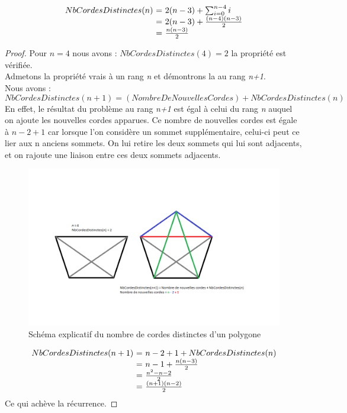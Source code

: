 \documentclass[a4paper,10pt]{article}
\begin{document}
\begin{equation} 
\begin{array}{r @{=} l}
NbCordesDistinctes(n) \ & \ 2(n-3) + \sum_{i=0}^{n-4} i \\
		      & \ 2(n-3) + \frac{(n-4)(n-3)}{2} \\
		      & \ \frac{n(n-3)}{2}
\end{array} 
\end{equation}


\begin{proof}
Pour \(n = 4\) nous avons : \(NbCordesDistinctes(4)=2 \) la propriété est vérifiée. \\
Admetons la propriété vrais à un rang \emph{n} et démontrons la au rang \emph{n+1}. \\
Nous avons :\\
\[NbCordesDistinctes(n+1) = (NombreDeNouvellesCordes) + NbCordesDistinctes(n)\]
En effet, le résultat du problème au rang \emph{n+1} est égal à celui du rang \emph{n} auquel on ajoute les nouvelles cordes apparues.
Ce nombre de nouvelles cordes est égale à \(n - 2 + 1 \) car lorsque l'on considère un sommet supplémentaire, celui-ci peut ce lier aux n anciens sommets.
On lui retire les deux sommets qui lui sont adjacents, et on rajoute une liaison entre ces deux sommets adjacents.

\begin{figure}[h!]
\begin{center}
\includegraphics[scale=0.5]{dem1.png}
\caption{Schéma explicatif du nombre de cordes distinctes d'un polygone}
\end{center}
\end{figure}

\[
\begin{array}{r @{=} l}
NbCordesDistinctes(n+1) \ & \ n -  2 + 1 + NbCordesDistinctes(n) \\
			  & \ n - 1 + \frac{n(n-3)}{2} \\
			  & \ \frac{{n^2}-n-2}{2} \\
			  & \ \frac{(n+1)(n-2)}{2} \\
\end{array}
\]
Ce qui achève la récurrence.	
\end{proof}
\end{document}
